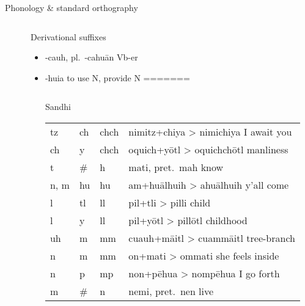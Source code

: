 \documentclass[12pt]{beamer}
\newcommand{\nah}[1]{\textcolor{nahgrn}{#1}}
\newcommand{\trs}[1]{\textcolor{nahblu}{#1}}
\begin{document}
\begin{frame}
\begin{columns}[t]
\begin{column}{.22\linewidth}
\begin{block}{Phonology \& standard orthography}
\begin{threeparttable}
\begin{tablenotes}
\begin{frame}
\begin{columns}[t]
\begin{column}{.25\linewidth}
    \end{column}
    \begin{column}{.22\linewidth}
      \begin{block}{Derivational suffixes}
        \begin{threeparttable}
          \vspace{-1.5ex}
          \begin{multicols}{2}
            \begin{itemize}
            \item \nah{-cauh}, pl.~\nah{-cahuān}  \trs{Vb-er}
            \item \nah{-huia} \trs{to use N, provide N}
=======
    \begin{column}{.26\linewidth}
      \begin{block}{Sandhi}
        \begin{threeparttable}
          \begin{tabular}{l@{+ }l@{> }ll}
            \nah{tz}   & \nah{ch} & \nah{chch}\tnote{1}   & \nah{nimitz}+\nah{chiya} > \nah{nimichiya} \trs{I await you}    \\
            \nah{ch}   & \nah{y}  & \nah{chch}\tnote{1}   & \nah{oquich}+\nah{yōtl} > \nah{oquichchōtl} \trs{manliness}     \\
            \nah{t}    & \nah{\#} & \nah{h}               & \nah{mati}, pret.~\nah{mah} \trs{know}                          \\
            \nah{n, m} & \nah{hu} & \nah{hu}              & \nah{am}+\nah{huālhuih} > \nah{ahuālhuih} \trs{y'all come}      \\
            \nah{l}    & \nah{tl} & \nah{ll}              & \nah{pil}+\nah{tli} > \nah{pilli} \trs{child}                   \\
            \nah{l}    & \nah{y}  & \nah{ll}              & \nah{pil}+\nah{yōtl} > \nah{pillōtl} \trs{childhood}            \\
            \nah{uh}   & \nah{m}  & \nah{mm}              & \nah{cuauh}+\nah{māitl} > \nah{cuammāitl} \trs{tree-branch}     \\
            \nah{n}    & \nah{m}  & \nah{mm}              & \nah{on}+\nah{mati} > \nah{ommati} \trs{she feels inside}       \\
            \nah{n}    & \nah{p}  & \nah{mp}              & \nah{non}+\nah{pēhua} > \nah{nompēhua} \trs{I go forth}         \\
            \nah{m}    & \nah{\#} & \nah{n}               & \nah{nemi}, pret.~\nah{nen} \trs{live}                          \\

\end{tabular}
\end{threeparttable}
\end{block}
\end{column}
\end{itemize}
\end{multicols}
\end{threeparttable}
\end{block}
\end{column}
\end{columns}
\end{frame}
\end{tablenotes}
\end{threeparttable}
\end{block}
\end{column}
\end{columns}
\end{frame}
\end{document}
